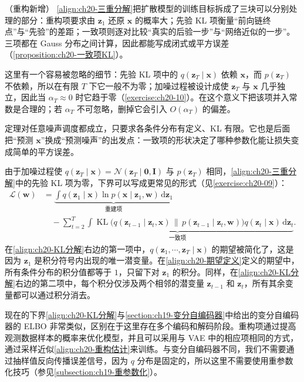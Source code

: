 \documentclass[../../main.tex]{subfiles}
\begin{document}
\begin{remark}（重构新增）
\eqref{align:ch20-三重分解}把扩散模型的训练目标拆成了三块可以分别处理的部分：重构项要求由 $\bm{z}_1$ 还原 $\bm{x}$ 的概率大；先验 KL 项衡量“前向链终点”与“先验”的差距；一致项则逐对比较“真实的后验一步”与“网络近似的一步”。三项都在 Gauss 分布之间计算，因此都能写成闭式或平方误差（\cref{proposition:ch20-一致项KL}）。\par
这里有一个容易被忽略的细节：先验 KL 项中的 $q(\bm{z}_T\mid\bm{x})$ 依赖 $\bm{x}$，而 $p(\bm{z}_T)$ 不依赖，所以在有限 $T$ 下它一般不为零；加噪过程被设计成使 $\bm{z}_T$ 与 $\bm{x}$ 几乎独立，因此当 $\alpha_T\approx0$ 时它趋于零（\cref{exercise:ch20-10}）。在这个意义下把该项并入常数是合理的；若 $\alpha_T$ 不可忽略，删掉它会引入 $O(\alpha_T)$ 的偏差。\par
定理对任意噪声调度都成立，只要求各条件分布有定义、KL 有限。它也是后面把“预测 $\bm{x}$”换成“预测噪声”的出发点：一致项的形状决定了哪种参数化能让损失变成简单的平方误差。
\end{remark}

由于加噪过程使 $q(\bm{z}_T\mid\bm{x})=\mathcal{N}(\bm{z}_T\mid\bm{0},\bm{I})$ 与 $p(\bm{z}_T)$ 相同，\eqref{align:ch20-三重分解}中的先验 KL 项为零，下界可以写成更常见的形式（见\cref{exercise:ch20-09}）：
\begin{align}
\mathcal{L}(\bm{w})&=\underbrace{\int q(\bm{z}_1\mid\bm{x})\ln p(\bm{x}\mid\bm{z}_1,\bm{w})\,\mathrm{d}\bm{z}_1}_{\text{重建项}}\nonumber\\
&\quad-\underbrace{\sum_{t=2}^{T}\int\operatorname{KL}\big(q(\bm{z}_{t-1}\mid\bm{z}_t,\bm{x})\,\|\,p(\bm{z}_{t-1}\mid\bm{z}_t,\bm{w})\big)q(\bm{z}_t\mid\bm{x})\,\mathrm{d}\bm{z}_t}_{\text{一致项}}.
\label{align:ch20-KL分解}
\end{align}
在\eqref{align:ch20-KL分解}右边的第一项中，$q(\bm{z}_1,\cdots,\bm{z}_T\mid\bm{x})$ 的期望被简化了，这是因为 $\bm{z}_1$ 是积分符号内出现的唯一潜变量。在\eqref{align:ch20-期望定义}定义的期望中，所有条件分布的积分值都等于 $1$，只留下对 $\bm{z}_1$ 的积分。同样，在\eqref{align:ch20-KL分解}右边的第二项中，每个积分仅涉及两个相邻的潜变量 $\bm{z}_{t-1}$ 和 $\bm{z}_t$，所有其余变量都可以通过积分消去。

现在的下界\eqref{align:ch20-KL分解}与\cref{section:ch19-变分自编码器}中给出的变分自编码器的 ELBO 非常类似，区别在于这里存在多个编码和解码阶段。重构项通过提高观测数据样本的概率来优化模型，并且可以采用与 VAE 中的相应项相同的方式，通过采样近似\eqref{align:ch20-重构估计}来训练。与变分自编码器不同，我们不需要通过抽样值反向传播误差信号，因为 $q$ 分布是固定的，所以这里不需要使用重参数化技巧（参见\cref{subsection:ch19-重参数化}）。
\end{document}
